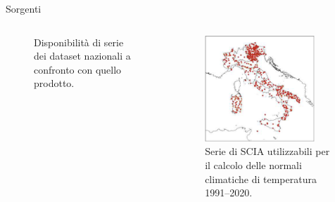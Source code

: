 \begin{frame}[t]{Sorgenti}
  \begin{columns}[t]
    \begin{column}{0.5\textwidth}
      \begin{figure}
        
        \caption*{Disponibilità di serie dei dataset nazionali a confronto con quello prodotto.}
      \end{figure}
    \end{column}

    \begin{column}{0.5\textwidth}
      \begin{figure}
        \includegraphics[height=4cm]{ASSETS/composizione_dataset/scia_disp.png}
        \caption*{Serie di SCIA utilizzabili per il calcolo delle normali climatiche di temperatura 1991--2020.}
      \end{figure}

    \end{column}
  \end{columns}
\end{frame}

